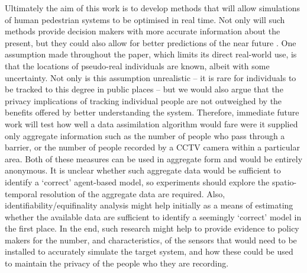 Ultimately the aim of this work is to develop methods that will allow simulations of human pedestrian systems to be optimised in real time. Not only will such methods provide decision makers with more accurate information about the present, but they could also allow for better predictions of the near future \citep[c.f.][]{kieu_dealing_2019}. One assumption made throughout the paper, which limits its direct real-world use, is that the locations of pseudo-real individuals are known, albeit with some uncertainty. Not only is this assumption unrealistic -- it is rare for individuals to be tracked to this degree in public places -- but we would also argue that the privacy implications of tracking individual people are not outweighed by the benefits offered by better understanding the system. Therefore, immediate future work will test how well a data assimilation algorithm would fare were it supplied only aggregate information such as the number of people who pass through a barrier, or the number of people recorded by a CCTV camera within a particular area. Both of these measures can be used in aggregate form and would be entirely anonymous. It is unclear whether such aggregate data would be sufficient to identify a `correct' agent-based model, so experiments should explore the spatio-temporal resolution of the aggregate data are required. Also, identifiability/equifinality analysis might help initially as a means of estimating whether the available data are sufficient to identify a seemingly `correct' model in the first place. In the end, such research might help to provide evidence to policy makers for the number, and characteristics, of the sensors that would need to be installed to accurately simulate the target system, and how these could be used to maintain the privacy of the people who they are recording.



